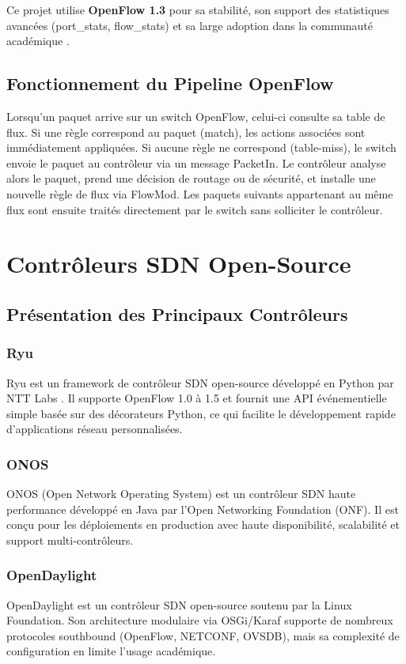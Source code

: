 \documentclass[12pt,a4paper]{report}
\begin{document}
Ce projet utilise \textbf{OpenFlow 1.3} pour sa stabilité,
son support des statistiques avancées (port\_stats,
flow\_stats) et sa large adoption dans la communauté
académique \cite{openflow_spec}.

\subsection{Fonctionnement du Pipeline OpenFlow}
Lorsqu'un paquet arrive sur un switch OpenFlow, celui-ci
consulte sa table de flux. Si une règle correspond au
paquet (match), les actions associées sont immédiatement
appliquées. Si aucune règle ne correspond (table-miss),
le switch envoie le paquet au contrôleur via un message
PacketIn. Le contrôleur analyse alors le paquet, prend
une décision de routage ou de sécurité, et installe une
nouvelle règle de flux via FlowMod. Les paquets suivants
appartenant au même flux sont ensuite traités directement
par le switch sans solliciter le contrôleur.

\section{Contrôleurs SDN Open-Source}

\subsection{Présentation des Principaux Contrôleurs}

\subsubsection{Ryu}
Ryu est un framework de contrôleur SDN open-source
développé en Python par NTT Labs \cite{ryu_doc}. Il
supporte OpenFlow 1.0 à 1.5 et fournit une API
événementielle simple basée sur des décorateurs Python,
ce qui facilite le développement rapide d'applications
réseau personnalisées.

\subsubsection{ONOS}
ONOS (Open Network Operating System) est un contrôleur
SDN haute performance développé en Java par l'Open
Networking Foundation (ONF). Il est conçu pour les
déploiements en production avec haute disponibilité,
scalabilité et support multi-contrôleurs.

\subsubsection{OpenDaylight}
OpenDaylight est un contrôleur SDN open-source soutenu
par la Linux Foundation. Son architecture modulaire via
OSGi/Karaf supporte de nombreux protocoles southbound
(OpenFlow, NETCONF, OVSDB), mais sa complexité de
configuration en limite l'usage académique.
\end{document}
